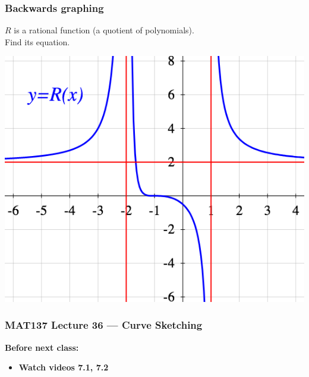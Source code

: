 \documentclass[14pt]{beamer}
\begin{document}
	\begin{frame}[t]
		\frametitle{Backwards graphing }

		$R$ is a rational function (a quotient of polynomials). \\ Find its equation.
		\begin{center}
			\includegraphics[scale=.4]{G19}
		\end{center}
	\end{frame}









\begin{frame}
	\frametitle{MAT137 Lecture 36 --- Curve Sketching}

	\vfill
	{\bf Before next class:}
		\begin{itemize} \normalsize
			\item {\bf Watch videos 7.1, 7.2}
		\end{itemize}
\end{frame}
\end{document}
